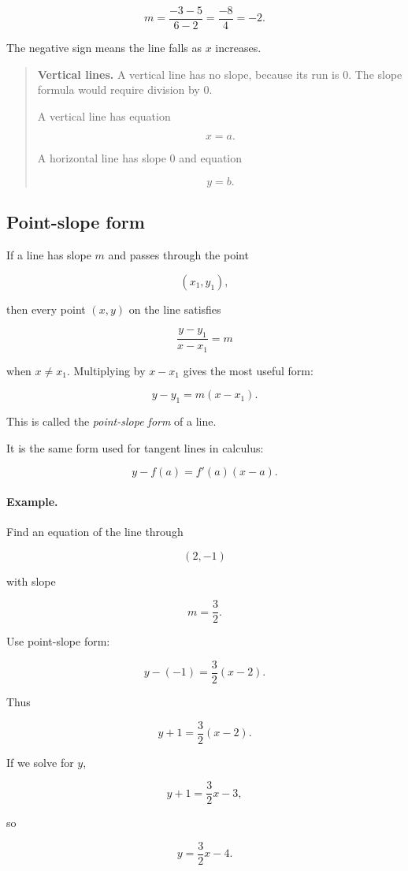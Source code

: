 \[
m=\frac{-3-5}{6-2}=\frac{-8}{4}=-2.
\]

The negative sign means the line falls as \(x\) increases.

\begin{quote}
\textbf{Vertical lines.}
A vertical line has no slope, because its run is \(0\).  The slope formula would
require division by \(0\).

A vertical line has equation

\[
x=a.
\]

A horizontal line has slope \(0\) and equation

\[
y=b.
\]
\end{quote}

\subsection{Point-slope form}
\label{appsubsec:point-slope-form}

If a line has slope \(m\) and passes through the point

\[
(x_1,y_1),
\]

then every point \((x,y)\) on the line satisfies

\[
\frac{y-y_1}{x-x_1}=m
\]

when \(x\neq x_1\).  Multiplying by \(x-x_1\) gives the most useful form:

\[
\boxed{
y-y_1=m(x-x_1).
}
\]

This is called the \emph{point-slope form} of a line.

It is the same form used for tangent lines in calculus:

\[
y-f(a)=f'(a)(x-a).
\]

\paragraph{Example.}
Find an equation of the line through

\[
(2,-1)
\]

with slope

\[
m=\frac32.
\]

Use point-slope form:

\[
y-(-1)=\frac32(x-2).
\]

Thus

\[
\boxed{
y+1=\frac32(x-2).
}
\]

If we solve for \(y\),

\[
y+1=\frac32x-3,
\]

so

\[
\boxed{
y=\frac32x-4.
}
\]

